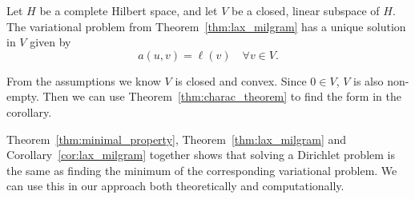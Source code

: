 \begin{kor}{\quad}
    Let $H$ be a complete Hilbert space, and let $V$ be a closed, linear subspace of $H$. The variational problem from Theorem~\ref{thm:lax_milgram} has a unique solution in $V$ given by\label{cor:lax_milgram}
   \begin{equation*}
    a(u,v) = \ell(v) \quad \forall v \in V.
   \end{equation*}
   \vspace{-8mm}
\end{kor}
\begin{bev}
    From the assumptions we know $V$ is closed and convex. Since $0 \in V$, $V$ is also non-empty. Then we can use Theorem~\ref{thm:charac_theorem} to find the form in the corollary.
\end{bev}
Theorem~\ref{thm:minimal_property}, Theorem~\ref{thm:lax_milgram} and Corollary~\ref{cor:lax_milgram} together shows that solving a Dirichlet problem is 
the same as finding the minimum of the corresponding variational problem. 
We can use this in our approach both theoretically and computationally.